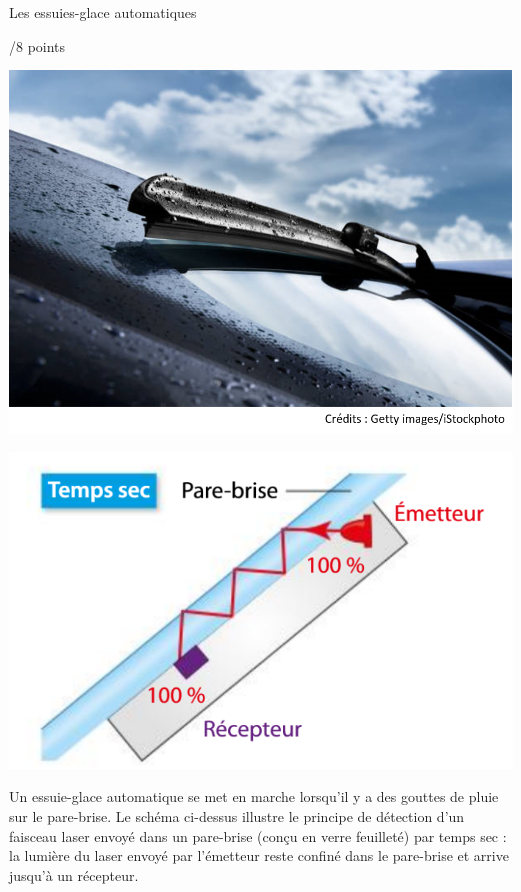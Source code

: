 \begin{doc}{Les essuies-glace automatiques \begin{Large}
    /8 points
\end{Large}}
\setcounter{exercice}{0}
\begin{minipage}{0.5\textwidth}
\begin{center}
    \includegraphics[scale=0.55]{Images/Essuis_glace.png}
\end{center}
\end{minipage}
\begin{minipage}{0.5\textwidth}
\begin{center}
    \includegraphics[scale=0.45]{Images/Temps_sec.PNG}
\end{center}
\end{minipage}
Un essuie-glace automatique se met en marche lorsqu'il y a des gouttes de pluie sur le pare-brise. Le schéma ci-dessus illustre le principe de détection d'un faisceau laser envoyé dans un pare-brise (conçu en verre feuilleté) par temps sec : la lumière du laser envoyé par l'émetteur reste confiné dans le pare-brise et arrive jusqu'à un récepteur.\vspace{1cm}%


\end{doc}
